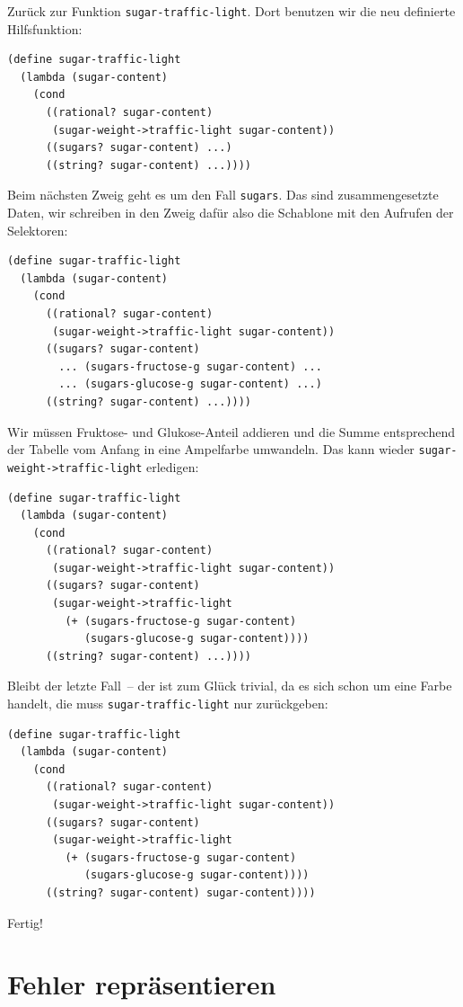 %
Zurück zur Funktion \lstinline{sugar-traffic-light}. Dort benutzen wir die
neu definierte Hilfsfunktion:
%
\begin{lstlisting}
(define sugar-traffic-light
  (lambda (sugar-content)
    (cond
      ((rational? sugar-content)
       (sugar-weight->traffic-light sugar-content))
      ((sugars? sugar-content) ...)
      ((string? sugar-content) ...))))
\end{lstlisting}         
%
Beim nächsten Zweig geht es um den Fall \lstinline{sugars}.
Das sind zusammengesetzte Daten, wir schreiben in den Zweig dafür also
die Schablone mit den Aufrufen der Selektoren:
%
\begin{lstlisting}
(define sugar-traffic-light
  (lambda (sugar-content)
    (cond
      ((rational? sugar-content)
       (sugar-weight->traffic-light sugar-content))
      ((sugars? sugar-content) 
        ... (sugars-fructose-g sugar-content) ...
        ... (sugars-glucose-g sugar-content) ...)
      ((string? sugar-content) ...))))
\end{lstlisting}         
%
Wir müssen Fruktose- und Glukose-Anteil addieren und die Summe
entsprechend der Tabelle vom Anfang in eine Ampelfarbe
umwandeln.  Das kann wieder
\lstinline{sugar-weight->traffic-light} 
erledigen:
%
\begin{lstlisting}
(define sugar-traffic-light
  (lambda (sugar-content)
    (cond
      ((rational? sugar-content)
       (sugar-weight->traffic-light sugar-content))
      ((sugars? sugar-content)
       (sugar-weight->traffic-light
         (+ (sugars-fructose-g sugar-content)
            (sugars-glucose-g sugar-content))))
      ((string? sugar-content) ...))))
\end{lstlisting}         
%
Bleibt der letzte Fall~-- der ist zum Glück trivial, da es sich schon
um eine Farbe handelt, die muss \lstinline{sugar-traffic-light} nur
zurückgeben:
%
\begin{lstlisting}
(define sugar-traffic-light
  (lambda (sugar-content)
    (cond
      ((rational? sugar-content)
       (sugar-weight->traffic-light sugar-content))
      ((sugars? sugar-content)
       (sugar-weight->traffic-light 
         (+ (sugars-fructose-g sugar-content)
            (sugars-glucose-g sugar-content))))
      ((string? sugar-content) sugar-content))))
\end{lstlisting}         
%
Fertig!

\section{Fehler repräsentieren}
\label{sec:slope}
\label{sec:maybe}

